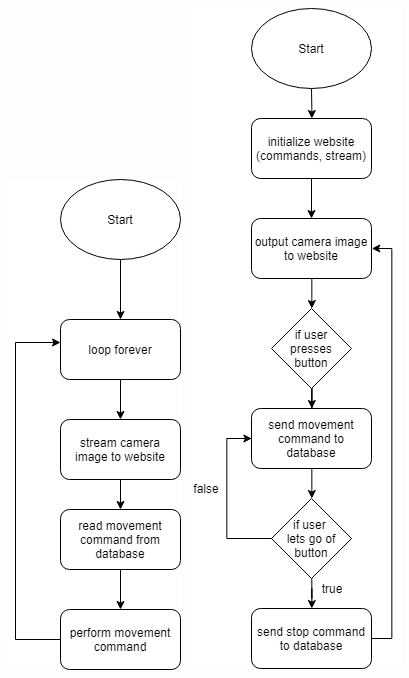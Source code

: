 \begin{figure}[h]
\includegraphics[scale=.3]{img/robotDiagram}
\includegraphics[scale=.3]{img/websiteDiagram}
\end{figure}
